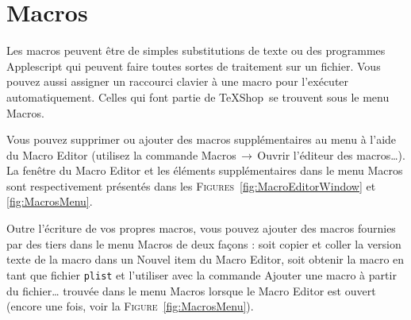 \documentclass[11pt,french]{article}
\newcommand{\TS}{\textsf{\TeX Shop}}
\newcommand{\mnu}[1]{\textsf{#1}}
\newcommand{\To}{\,\(\to\)\,}
\begin{document}

\section{Macros}

Les macros peuvent être de simples substitutions de texte ou des programmes Applescript qui peuvent faire toutes sortes de traitement sur un fichier. Vous pouvez aussi assigner un raccourci clavier à une macro pour l'exécuter automatiquement. Celles qui font partie de \TS\ se trouvent sous le menu \mnu{Macros}.

Vous pouvez supprimer ou ajouter des macros supplémentaires au menu à l'aide du \mnu{Macro Editor} (utilisez la commande \mnu{Macros}\To\mnu{Ouvrir l'éditeur des macros…}). La fenêtre du \mnu{Macro Editor} et les éléments supplémentaires dans le menu \mnu{Macros} sont respectivement présentés dans les \textsc{Figures}~\ref{fig:MacroEditorWindow} et \ref{fig:MacrosMenu}.

Outre l'écriture de vos propres macros, vous pouvez ajouter des macros fournies par des tiers dans le menu \mnu{Macros} de deux façons : soit copier et coller la version texte de la macro dans un \mnu{Nouvel item} du \mnu{Macro Editor}, soit obtenir la macro en tant que fichier \texttt{plist} et l'utiliser avec la commande \mnu{Ajouter une macro à partir du fichier…} trouvée dans le menu \mnu{Macros} lorsque le \mnu{Macro Editor} est ouvert (encore une fois, voir la \textsc{Figure}~\ref{fig:MacrosMenu}).
\end{document}
